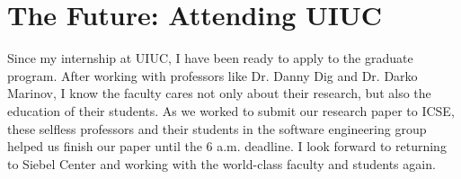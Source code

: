 \section*{The Future: Attending UIUC}
Since my internship at UIUC, I have been ready to apply to the graduate program. 
After working with professors like Dr. Danny Dig and Dr. Darko Marinov, I know the faculty cares not only about their research, but also the education of their students. 
As we worked to submit our research paper to ICSE, these selfless professors and their students in the software engineering group helped us finish our paper until the 6 a.m. deadline. 
I look forward to returning to Siebel Center and working with the world-class faculty and students again.